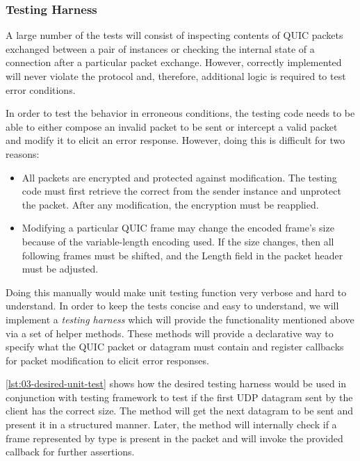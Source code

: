 \subsubsection{Testing Harness}\label{sec:03-testing-harness}

A large number of the tests will consist of inspecting contents of QUIC packets exchanged between a
pair of \QuicConnection{} instances or checking the internal state of a connection after a
particular packet exchange. However, correctly implemented \QuicConnection{} will never violate the
protocol and, therefore, additional logic is required to test error conditions.

In order to test the behavior in erroneous conditions, the testing code needs to be able to either
compose an invalid packet to be sent or intercept a valid packet and modify it to elicit an error
response. However, doing this is difficult for two reasons:

\begin{itemize}

  \item All packets are encrypted and protected against modification. The testing code must first
retrieve the correct \CryptoSeal{} from the sender \QuicConnection{} instance and unprotect the
packet. After any modification, the encryption must be reapplied.

  \item Modifying a particular QUIC frame may change the encoded frame's size because of the
variable-length encoding used. If the size changes, then all following frames must be shifted, and
the Length field in the packet header must be adjusted.

\end{itemize}

Doing this manually would make unit testing function very verbose and hard to understand. In order
to keep the tests concise and easy to understand, we will implement a \textit{testing harness} which
will provide the functionality mentioned above via a set of helper methods. These methods will
provide a declarative way to specify what the QUIC packet or datagram must contain and register
callbacks for packet modification to elicit error responses.

\autoref{lst:03-desired-unit-test} shows how the desired testing harness would be used in
conjunction with \xUnit{} testing framework to test if the first UDP datagram sent by the client has
the correct size. The  method will get the next datagram to be sent and
present it in a structured manner. Later, the  method will
internally check if a frame represented by  type is present in the packet and will
invoke the provided callback for further assertions.

